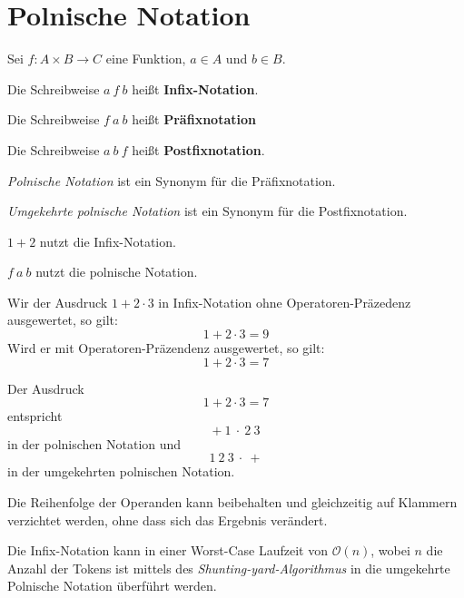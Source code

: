 \section{Polnische Notation}
\begin{definition}
    Sei $f: A \times B \rightarrow C$ eine Funktion, $a \in A$ und $b \in B$.

    \begin{defenum}
        \item Die Schreibweise $a\ f\ b$ heißt \textbf{Infix-Notation}.
        \item Die Schreibweise $f\ a\ b$ heißt \textbf{Präfixnotation}
        \item Die Schreibweise $a\ b\ f$ heißt \textbf{Postfixnotation}.
    \end{defenum}
\end{definition}

\textit{Polnische Notation} ist ein Synonym für die Präfixnotation.

\textit{Umgekehrte polnische Notation} ist ein Synonym für die Postfixnotation.

\begin{beispiel}
    \begin{bspenum}
        \item $1 + 2$ nutzt die Infix-Notation.
        \item $f\ a\ b$ nutzt die polnische Notation.
        \item Wir der Ausdruck $1 + 2 \cdot 3$ in Infix-Notation ohne Operatoren-Präzedenz
              ausgewertet, so gilt: 
              \[1 + 2 \cdot 3 = 9\]
              Wird er mit Operatoren-Präzendenz ausgewertet, so gilt:
              \[1 + 2 \cdot 3 = 7\]
        \item Der Ausdruck
              \[1 + 2 \cdot 3 = 7\]
              entspricht
              \[+\ 1\ \cdot\ 2\ 3\]
              in der polnischen Notation und
              \[1\ 2\ 3\ \cdot\ +\]
              in der umgekehrten polnischen Notation.
    \end{bspenum}
\end{beispiel}

\begin{bemerkung}
    \begin{bemenum}
        \item Die Reihenfolge der Operanden kann beibehalten und gleichzeitig
              auf Klammern verzichtet werden, ohne dass sich das Ergebnis 
              verändert.
        \item Die Infix-Notation kann in einer Worst-Case Laufzeit von $\mathcal{O}(n)$,
              wobei $n$ die Anzahl der Tokens ist mittels des
              \textit{Shunting-yard-Algorithmus} in
              die umgekehrte Polnische Notation überführt werden.
    \end{bemenum}
\end{bemerkung}

